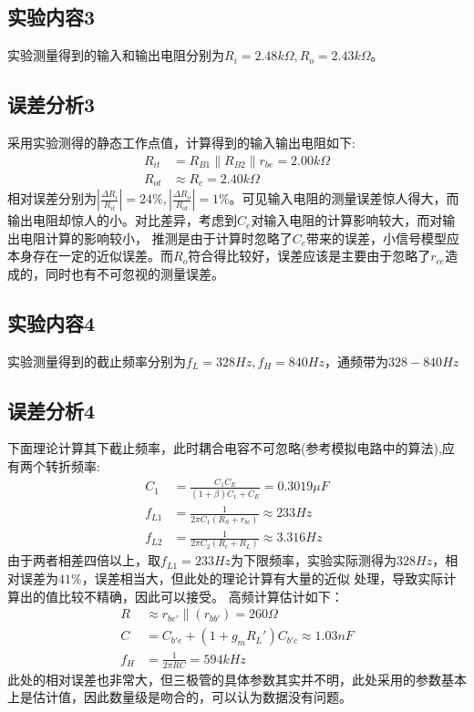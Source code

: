 \documentclass[a4paper,11pt,UTF8]{ctexart}
\begin{document}
  \subsection{实验内容3}
  实验测量得到的输入和输出电阻分别为$R_i=2.48k\Omega,R_o=2.43k\Omega$。
  \subsection{误差分析3}
  采用实验测得的静态工作点值，计算得到的输入输出电阻如下:
  \begin{equation}
    \begin{aligned}
      R_{it}&=R_{B1}\parallel R_{B2}\parallel r_{be}=2.00k\Omega\\
      R_{ot}&\approx R_{c}=2.40k\Omega
    \end{aligned}
  \end{equation}
  相对误差分别为$\left |\frac{\Delta R_{i}}{R_{it}}\right |=24\%,\left |\frac{\Delta R_{o}}{R_{ot}}\right |=1\%$。可见输入电阻的测量误差惊人得大，而输出电阻却惊人的小。对比差异，考虑到$C_e$对输入电阻的计算影响较大，而对输出电阻计算的影响较小，
  推测是由于计算时忽略了$C_e$带来的误差，小信号模型应本身存在一定的近似误差。而$R_{o}$符合得比较好，误差应该是主要由于忽略了$r_{ce}$造成的，同时也有不可忽视的测量误差。
  \subsection{实验内容4}
  实验测量得到的截止频率分别为$f_L=328Hz,f_H=840Hz$，通频带为$328-840Hz$
  \subsection{误差分析4}
  下面理论计算其下截止频率，此时耦合电容不可忽略(参考模拟电路中的算法),应有两个转折频率:
  \begin{equation}
    \begin{aligned}
     C_1&=\frac{C_1C_E}{(1+\beta)C_1+C_E}=0.3019\mu F\\
     f_{L1}&=\frac{1}{2\pi C_1(R_S+r_{be})}\approx 233Hz\\
     f_{L2}&=\frac{1}{2\pi C_2(R_c+R_L)}\approx 3.316Hz
    \end{aligned}
  \end{equation}
  由于两者相差四倍以上，取$f_{L1}=233Hz$为下限频率，实验实际测得为$328Hz$，相对误差为$41\%$，误差相当大，但此处的理论计算有大量的近似
  处理，导致实际计算出的值比较不精确，因此可以接受。
  高频计算估计如下：
  \begin{equation}
    \begin{aligned}
      R&\approx r_{be'}\parallel(r_{bb'})=260\Omega\\
      C&=C_{b'e}+(1+g_m R_L')C_{b'c}\approx 1.03 nF\\
      f_H&=\frac{1}{2\pi RC}=594kHz
    \end{aligned}
  \end{equation}
  此处的相对误差也非常大，但三极管的具体参数其实并不明，此处采用的参数基本上是估计值，因此数量级是吻合的，可以认为数据没有问题。
\end{document}
